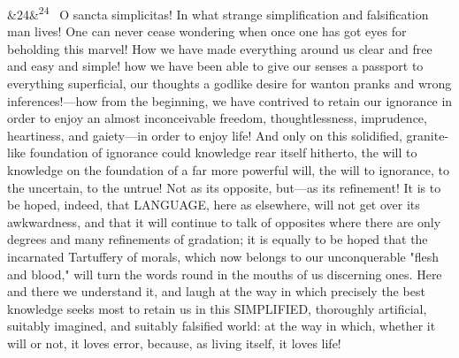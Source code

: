 \documentclass[12pt]{article}
\newcommand{\para}[1][]{\par\noindent\ifx&#1&\else\textsuperscript{\footnotesize #1}~\fi}
\begin{document}
\para[24] O sancta simplicitas! In what strange simplification and falsification man lives! One can never cease wondering when once one has got eyes for beholding this marvel! How we have made everything around us clear and free and easy and simple! how we have been able to give our senses a passport to everything superficial, our thoughts a godlike desire for wanton pranks and wrong inferences!---how from the beginning, we have contrived to retain our ignorance in order to enjoy an almost inconceivable freedom, thoughtlessness, imprudence, heartiness, and gaiety---in order to enjoy life! And only on this solidified, granite-like foundation of ignorance could knowledge rear itself hitherto, the will to knowledge on the foundation of a far more powerful will, the will to ignorance, to the uncertain, to the untrue! Not as its opposite, but---as its refinement! It is to be hoped, indeed, that LANGUAGE, here as elsewhere, will not get over its awkwardness, and that it will continue to talk of opposites where there are only degrees and many refinements of gradation; it is equally to be hoped that the incarnated Tartuffery of morals, which now belongs to our unconquerable "flesh and blood," will turn the words round in the mouths of us discerning ones. Here and there we understand it, and laugh at the way in which precisely the best knowledge seeks most to retain us in this SIMPLIFIED, thoroughly artificial, suitably imagined, and suitably falsified world: at the way in which, whether it will or not, it loves error, because, as living itself, it loves life!
\end{document}
